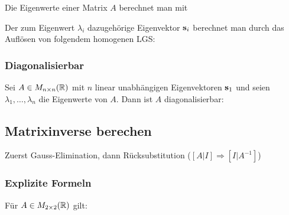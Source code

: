 \begin{multicols*}{3}
    Die Eigenwerte einer Matrix $A$ berechnet man mit

    \begin{center}
    \end{center}

    Der zum Eigenwert $\lambda_i$ dazugehörige Eigenvektor $\mathbf{s}_i$ berechnet man durch das Auflösen von folgendem homogenen LGS:

    \begin{center}
    \end{center}


    \subsubsection{Diagonalisierbar}

    Sei $A \in M_{n \times n}(\mathbb{R})$ mit $n$ linear unabhängigen Eigenvektoren $\mathbf{s}_1$ und seien $\lambda_1, \dots, \lambda_n$ die Eigenwerte von $A$. Dann ist $A$ diagonalisierbar:

    \begin{center}
    \end{center}


    \subsection{Matrixinverse berechen}

    Zuerst Gauss-Elimination, dann Rücksubstitution ($[A | I] \Rightarrow [I | A^{-1}]$)

    \subsubsection{Explizite Formeln}

    Für $A \in M_{2 \times 2}(\mathbb{R})$ gilt:

    \begin{center}
    \end{center}


\end{multicols*}
